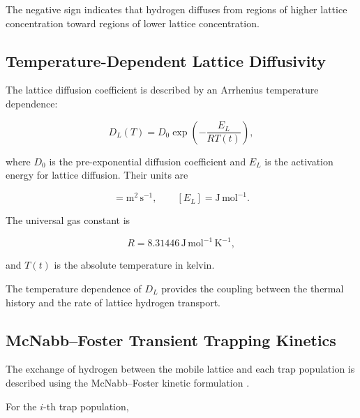 The negative sign indicates that hydrogen diffuses from regions of
higher lattice concentration toward regions of lower lattice
concentration.

\subsection{Temperature-Dependent Lattice Diffusivity}
\label{subsec:lattice_diffusivity}

The lattice diffusion coefficient is described by an Arrhenius
temperature dependence:

\begin{equation}
D_L(T)
=
D_0
\exp\left(
-\frac{E_L}{RT(t)}
\right),
\label{eq:ch3_arrhenius_DL}
\end{equation}

where $D_0$ is the pre-exponential diffusion coefficient and $E_L$ is
the activation energy for lattice diffusion. Their units are

\begin{equation}
[D_0]=\mathrm{m^2\,s^{-1}},
\qquad
[E_L]=\mathrm{J\,mol^{-1}}.
\end{equation}

The universal gas constant is

\begin{equation}
R=8.31446\,
\mathrm{J\,mol^{-1}\,K^{-1}},
\label{eq:ch3_R}
\end{equation}

and $T(t)$ is the absolute temperature in kelvin.

The temperature dependence of $D_L$ provides the coupling between the
thermal history and the rate of lattice hydrogen transport.

\subsection{McNabb--Foster Transient Trapping Kinetics}
\label{subsec:mcnabb_foster}

The exchange of hydrogen between the mobile lattice and each trap
population is described using the McNabb--Foster kinetic formulation
\cite{McNabb1963,Turnbull1997,Krom2000,Legrand2015,Marrani2025}.

For the $i$-th trap population,

